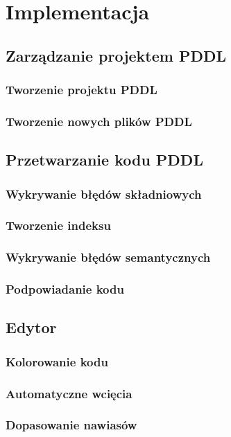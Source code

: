 \chapter{Implementacja}
\section{Zarządzanie projektem PDDL}
\subsection{Tworzenie projektu PDDL}
\subsection{Tworzenie nowych plików PDDL}
\section{Przetwarzanie kodu PDDL}
\subsection{Wykrywanie błędów składniowych}
\subsection{Tworzenie indeksu}
\subsection{Wykrywanie błędów semantycznych}
\subsection{Podpowiadanie kodu}
\section{Edytor}
\subsection{Kolorowanie kodu}
\subsection{Automatyczne wcięcia}
\subsection{Dopasowanie nawiasów}
